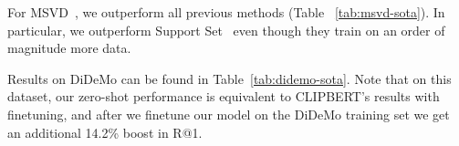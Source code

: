 \documentclass[10pt,twocolumn,letterpaper]{article}
\begin{document}
For MSVD~\cite{chen2011collecting}, we outperform all previous methods (Table ~\ref{tab:msvd-sota}). In particular, we outperform Support Set~\cite{patrick2020support} even though they train on an order of magnitude more data.
\begin{table}
\centering
\caption{Text-to-video retrieval results on the MSVD~\cite{chen2011collecting} test set.}
\label{tab:msvd-sota}
\end{table} 
Results on DiDeMo can be found in Table~\ref{tab:didemo-sota}. Note that on this dataset, our zero-shot performance is equivalent to CLIPBERT's results with finetuning, and after we finetune our model on the DiDeMo training set we get an additional 14.2\% boost in R@1.
\end{document}
